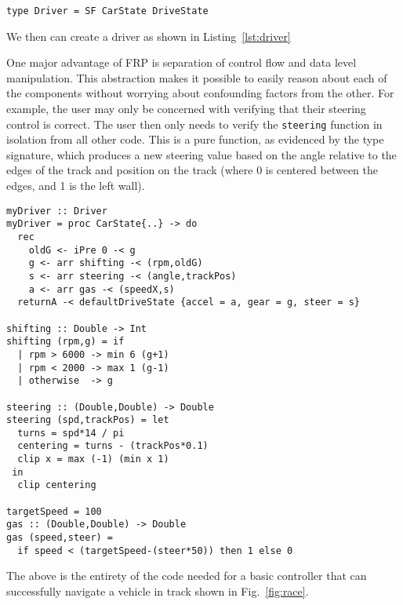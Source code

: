 \begin{lstlisting}
type Driver = SF CarState DriveState
\end{lstlisting}

We then can create a driver as shown in Listing~\ref{lst:driver}

One major advantage of FRP is separation of control flow and data level manipulation. 
This abstraction makes it possible to easily reason about each of the components without worrying about confounding factors from the other.
For example, the user may only be concerned with verifying that their steering control is correct.
The user then only needs to verify the \texttt{steering} function in isolation from all other code.
This is a pure function, as evidenced by the type signature, which produces a new steering value based on the angle relative to the edges of the track and position on the track (where 0 is centered between the edges, and 1 is the left wall).

\begin{lstlisting}[float,floatplacement=HR,caption=A complete basic controller in Yampa, label=lst:driver]
myDriver :: Driver
myDriver = proc CarState{..} -> do
  rec 
    oldG <- iPre 0 -< g
    g <- arr shifting -< (rpm,oldG)
    s <- arr steering -< (angle,trackPos)
    a <- arr gas -< (speedX,s)
  returnA -< defaultDriveState {accel = a, gear = g, steer = s}

shifting :: Double -> Int
shifting (rpm,g) = if 
  | rpm > 6000 -> min 6 (g+1)
  | rpm < 2000 -> max 1 (g-1)
  | otherwise  -> g
 
steering :: (Double,Double) -> Double
steering (spd,trackPos) = let
  turns = spd*14 / pi
  centering = turns - (trackPos*0.1)
  clip x = max (-1) (min x 1)
 in
  clip centering
  
targetSpeed = 100
gas :: (Double,Double) -> Double
gas (speed,steer) = 
  if speed < (targetSpeed-(steer*50)) then 1 else 0
\end{lstlisting}

The above is the entirety of the code needed for a basic controller that can successfully navigate a vehicle in track shown in Fig.~\ref{fig:race}.
